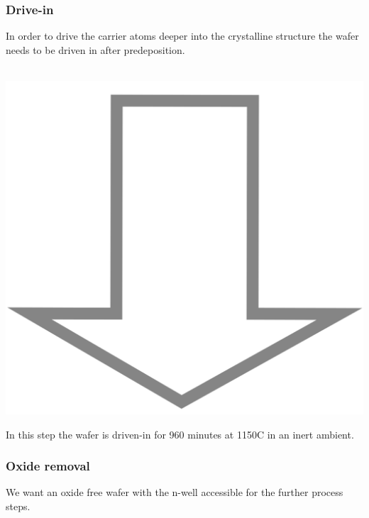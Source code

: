 \subsubsection{Drive-in}
In order to drive the carrier atoms deeper into the crystalline structure the wafer needs to be driven in after predeposition.
\begin{center}
	\begin{tikzpicture}[node distance = 3cm, auto, thick,scale=0.3, every node/.style={transform shape}]
		
	\end{tikzpicture} \\
	\includegraphics[scale=0.01]{down_arrow.png} \\
	\begin{tikzpicture}[node distance = 3cm, auto, thick,scale=0.3, every node/.style={transform shape}]
		
	\end{tikzpicture}
\end{center}
In this step the wafer is  driven-in for 960 minutes at 1150\degree C in an inert ambient.

\subsubsection{Oxide removal}
We want an oxide free wafer with the n-well accessible for the further process steps.


